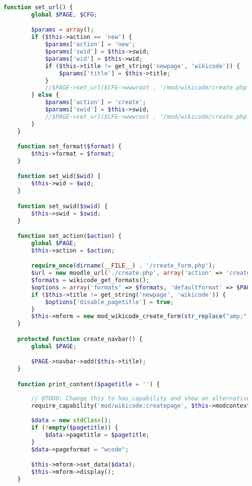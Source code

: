 \begin{lstlisting}[language=PHP]
    function set_url() {
        global $PAGE, $CFG;

        $params = array();
        if ($this->action == 'new') {
            $params['action'] = 'new';
            $params['swid'] = $this->swid;
            $params['wid'] = $this->wid;
            if ($this->title != get_string('newpage', 'wikicode')) {
                $params['title'] = $this->title;
            }
            //$PAGE->set_url($CFG->wwwroot . '/mod/wikicode/create.php', $params);
        } else {
            $params['action'] = 'create';
            $params['swid'] = $this->swid;
            //$PAGE->set_url($CFG->wwwroot . '/mod/wikicode/create.php', $params);
        }
    }

    function set_format($format) {
        $this->format = $format;
    }

    function set_wid($wid) {
        $this->wid = $wid;
    }

    function set_swid($swid) {
        $this->swid = $swid;
    }

    function set_action($action) {
        global $PAGE;
        $this->action = $action;

        require_once(dirname(__FILE__) . '/create_form.php');
        $url = new moodle_url('./create.php', array('action' => 'create', 'wid' => $this->wid, 'gid' => $this->gid, 'uid' => $this->uid));
        $formats = wikicode_get_formats();
        $options = array('formats' => $formats, 'defaultformat' => $PAGE->activityrecord->defaultformat, 'forceformat' => $PAGE->activityrecord->forceformat);
        if ($this->title != get_string('newpage', 'wikicode')) {
            $options['disable_pagetitle'] = true;
        }
        $this->mform = new mod_wikicode_create_form(str_replace("amp;","",$url->out()), $options);
    }

    protected function create_navbar() {
        global $PAGE;

        $PAGE->navbar->add($this->title);
    }

    function print_content($pagetitle = '') {
 
        // @TODO: Change this to has_capability and show an alternative interface.
        require_capability('mod/wikicode:createpage', $this->modcontext, NULL, true, 'nocreatepermission', 'wikicode');
		
        $data = new stdClass();
        if (!empty($pagetitle)) {
            $data->pagetitle = $pagetitle;
        }
        $data->pageformat = "wcode";

        $this->mform->set_data($data);
        $this->mform->display();
    }


\end{lstlisting}
